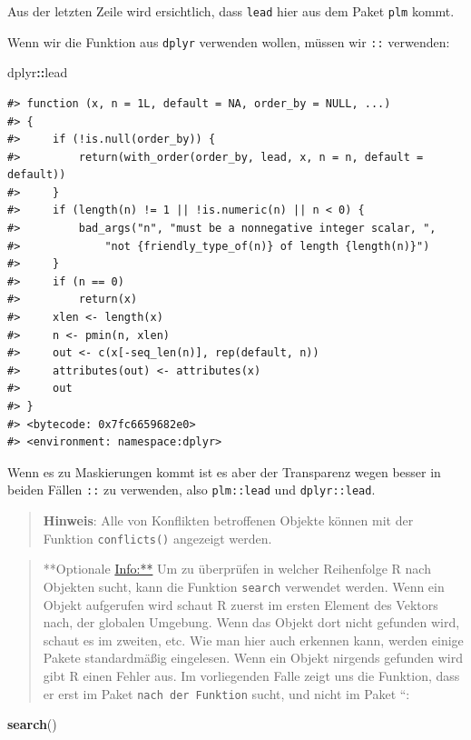 \documentclass[]{book}
\newenvironment{Shaded}{\begin{snugshade}}{\end{snugshade}}
\newcommand{\KeywordTok}[1]{\textcolor[rgb]{0.13,0.29,0.53}{\textbf{#1}}}
\newcommand{\OperatorTok}[1]{\textcolor[rgb]{0.81,0.36,0.00}{\textbf{#1}}}
\newcommand{\NormalTok}[1]{#1}
\begin{document}
Aus der letzten Zeile wird ersichtlich, dass \texttt{lead} hier aus dem
Paket \texttt{plm} kommt.

Wenn wir die Funktion aus \texttt{dplyr} verwenden wollen, müssen wir
\texttt{::} verwenden:

\begin{Shaded}
\begin{Highlighting}[]
\NormalTok{dplyr}\OperatorTok{::}\NormalTok{lead}
\end{Highlighting}
\end{Shaded}

\begin{verbatim}
#> function (x, n = 1L, default = NA, order_by = NULL, ...) 
#> {
#>     if (!is.null(order_by)) {
#>         return(with_order(order_by, lead, x, n = n, default = default))
#>     }
#>     if (length(n) != 1 || !is.numeric(n) || n < 0) {
#>         bad_args("n", "must be a nonnegative integer scalar, ", 
#>             "not {friendly_type_of(n)} of length {length(n)}")
#>     }
#>     if (n == 0) 
#>         return(x)
#>     xlen <- length(x)
#>     n <- pmin(n, xlen)
#>     out <- c(x[-seq_len(n)], rep(default, n))
#>     attributes(out) <- attributes(x)
#>     out
#> }
#> <bytecode: 0x7fc6659682e0>
#> <environment: namespace:dplyr>
\end{verbatim}

Wenn es zu Maskierungen kommt ist es aber der Transparenz wegen besser
in beiden Fällen \texttt{::} zu verwenden, also \texttt{plm::lead} und
\texttt{dplyr::lead}.

\begin{quote}
\textbf{Hinweis}: Alle von Konflikten betroffenen Objekte können mit der
Funktion \texttt{conflicts()} angezeigt werden.
\end{quote}

\begin{quote}
**Optionale \url{Info:**} Um zu überprüfen in welcher Reihenfolge R nach
Objekten sucht, kann die Funktion \texttt{search} verwendet werden. Wenn
ein Objekt aufgerufen wird schaut R zuerst im ersten Element des Vektors
nach, der globalen Umgebung. Wenn das Objekt dort nicht gefunden wird,
schaut es im zweiten, etc. Wie man hier auch erkennen kann, werden
einige Pakete standardmäßig eingelesen. Wenn ein Objekt nirgends
gefunden wird gibt R einen Fehler aus. Im vorliegenden Falle zeigt uns
die Funktion, dass er erst im Paket \texttt{nach\ der\ Funktion} sucht,
und nicht im Paket ``:
\end{quote}

\begin{Shaded}
\begin{Highlighting}[]
\KeywordTok{search}\NormalTok{()}
\end{Highlighting}
\end{Shaded}
\end{document}
